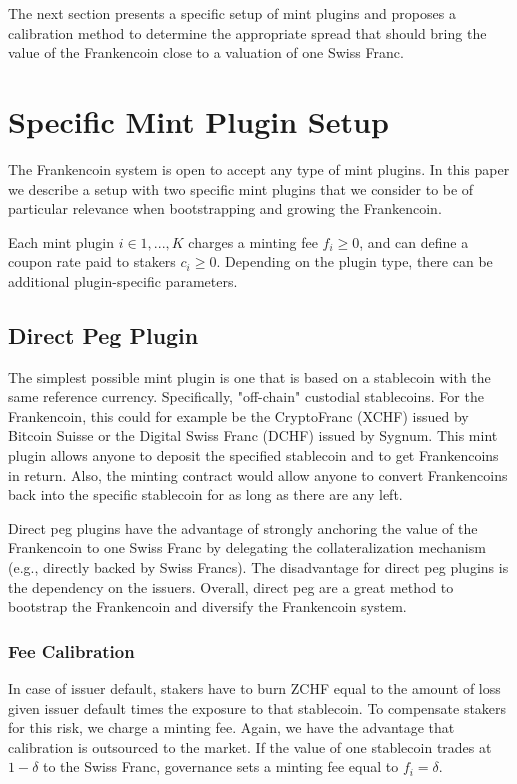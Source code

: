 \documentclass[english,11pt]{article}
\begin{document}
The next section presents a specific setup of mint plugins and proposes
a calibration method to determine the appropriate spread that should
bring the value of the Frankencoin close to a valuation of one Swiss Franc. 

\section{Specific Mint Plugin Setup}
The Frankencoin system is open to accept any type of mint plugins. 
In this paper we describe a setup with two specific mint plugins that 
we consider to be of particular relevance when bootstrapping and growing the Frankencoin.

Each mint plugin $i \in 1,...,K$ charges a minting fee $f_i \geq 0$, and can define
a coupon rate paid to stakers $c_i \geq 0$. Depending on the plugin type,
there can be additional plugin-specific parameters.

\subsection{Direct Peg Plugin}
The simplest possible mint plugin is one that is based on a stablecoin with the same reference currency. Specifically, "off-chain" custodial stablecoins. For the Frankencoin, this could for example be the CryptoFranc (XCHF) issued by Bitcoin Suisse or the Digital Swiss Franc (DCHF) issued by Sygnum. 
This mint plugin allows anyone to deposit the specified stablecoin and to get Frankencoins in return. Also, the minting contract would allow anyone to convert Frankencoins back into the specific stablecoin for as long as there are any left.

Direct peg plugins have the advantage of strongly anchoring the value of the Frankencoin to one Swiss Franc by delegating the collateralization mechanism
(e.g., directly backed by Swiss Francs).  
The disadvantage for direct peg plugins is the dependency on 
the issuers. Overall, direct peg are a great method to bootstrap 
the Frankencoin and diversify the Frankencoin system.

\subsubsection{Fee Calibration}
In case of issuer default, stakers have to burn ZCHF equal to the amount of
loss given issuer default times the exposure to that stablecoin. 
To compensate stakers for this risk,
we charge a minting fee. Again, we have the advantage that 
calibration is outsourced to the market.
If the value of one stablecoin trades at $1-\delta$ to the Swiss Franc, governance
sets a minting fee equal to $f_i = \delta$.
\end{document}
